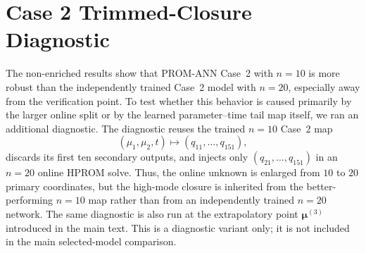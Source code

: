 \documentclass[11pt]{article}
\begin{document}
\begin{table}[H]
\centering
\caption{Oracle high-mode perturbation diagnostic for basis selection. Errors are averaged over $\bm\mu^{(v)}$, $\bm\mu^{(1)}$, $\bm\mu^{(2)}$; perturbed rows also average over five random seeds.}
\label{tab:metric-oracle-diagnostic}
\end{table}

\section{Case 2 Trimmed-Closure Diagnostic}
\label{app:case2-trimmed-diagnostic}

The non-enriched results show that PROM-ANN Case~2 with $n=10$ is more robust
than the independently trained Case~2 model with $n=20$, especially away from
the verification point.  To test whether this behavior is caused primarily by
the larger online split or by the learned parameter--time tail map itself, we
ran an additional diagnostic.  The diagnostic reuses the trained $n=10$ Case~2
map
\begin{equation}
(\mu_1,\mu_2,t)\mapsto(q_{11},\ldots,q_{151}),
\end{equation}
discards its first ten secondary outputs, and injects only
$(q_{21},\ldots,q_{151})$ in an $n=20$ online HPROM solve.  Thus, the online
unknown is enlarged from $10$ to $20$ primary coordinates, but the high-mode
closure is inherited from the better-performing $n=10$ map rather than from an
independently trained $n=20$ network.  The same diagnostic is also run at the
extrapolatory point $\bm\mu^{(3)}$ introduced in the main text.  This is a
diagnostic variant only; it is not included in the main selected-model
comparison.


\end{document}
